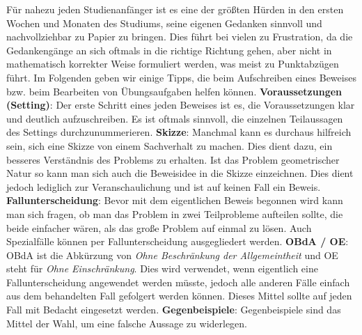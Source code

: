 Für nahezu jeden Studienanfänger ist es eine der größten Hürden in den ersten
Wochen und Monaten des Studiums, seine eigenen Gedanken sinnvoll und
nachvollziehbar zu Papier zu bringen.
Dies führt bei vielen zu Frustration, da die Gedankengänge an sich oftmals in
die richtige Richtung gehen, aber nicht in mathematisch korrekter Weise
formuliert werden, was meist zu Punktabzügen führt.
Im Folgenden geben wir einige Tipps, die beim Aufschreiben eines Beweises bzw.
beim Bearbeiten von Übungsaufgaben helfen können.
\newline
\newline
\textbf{Voraussetzungen (Setting)}:\newline
Der erste Schritt eines jeden Beweises ist es, die Voraussetzungen klar und
deutlich aufzuschreiben.
Es ist oftmals sinnvoll, die einzelnen Teilaussagen des Settings
durchzunummerieren.
\newline\newline
\textbf{Skizze}:\newline
Manchmal kann es durchaus hilfreich sein, sich eine Skizze von einem Sachverhalt
zu machen.
Dies dient dazu, ein besseres Verständnis des Problems zu erhalten.
Ist das Problem geometrischer Natur so kann man sich auch die Beweisidee in die
Skizze einzeichnen.
Dies dient jedoch lediglich zur Veranschaulichung und ist auf keinen Fall ein
Beweis.
\newline\newline
\textbf{Fallunterscheidung}:\newline
Bevor mit dem eigentlichen Beweis begonnen wird kann man sich fragen, ob man das
Problem in zwei Teilprobleme aufteilen sollte, die beide einfacher wären,
als das große Problem auf einmal zu lösen.
Auch Spezialfälle können per Fallunterscheidung ausgegliedert werden.
\newline\newline
\textbf{OBdA / OE}:\newline
OBdA ist die Abkürzung von \textit{Ohne Beschränkung der Allgemeintheit} und
OE steht für \textit{Ohne Einschränkung}.
Dies wird verwendet, wenn eigentlich eine Fallunterscheidung angewendet werden
müsste, jedoch alle anderen Fälle einfach aus dem behandelten Fall gefolgert
werden können.
Dieses Mittel sollte auf jeden Fall mit Bedacht eingesetzt werden.
\newline\newline
\textbf{Gegenbeispiele}:\newline
Gegenbeispiele sind das Mittel der Wahl, um eine falsche Aussage zu widerlegen.
\newline\newline

